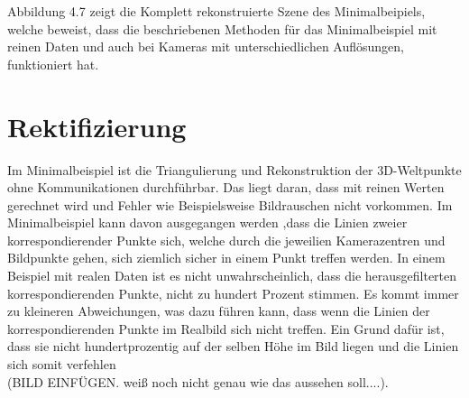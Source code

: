 \pagebreak
Abbildung 4.7 zeigt die Komplett rekonstruierte Szene des Minimalbeipiels, welche beweist, dass die beschriebenen Methoden für das Minimalbeispiel mit reinen Daten und auch bei Kameras mit unterschiedlichen Auflösungen, funktioniert hat. 

\section{Rektifizierung}
\label{sec:rectification}




Im Minimalbeispiel ist die Triangulierung und Rekonstruktion der 3D-Weltpunkte ohne Kommunikationen durchführbar. Das liegt daran, dass mit reinen Werten gerechnet wird und Fehler wie Beispielsweise Bildrauschen nicht vorkommen. Im Minimalbeispiel kann davon ausgegangen werden ,dass die Linien zweier korrespondierender Punkte sich, welche durch die jeweilien Kamerazentren und Bildpunkte gehen, sich ziemlich sicher in einem Punkt treffen werden. In einem Beispiel mit realen Daten ist es nicht unwahrscheinlich, dass die herausgefilterten korrespondierenden Punkte, nicht zu hundert Prozent stimmen. Es kommt immer zu kleineren Abweichungen, was dazu führen kann, dass wenn die Linien der korrespondierenden Punkte im Realbild sich nicht treffen. Ein Grund dafür ist, dass sie nicht hundertprozentig auf der selben Höhe im Bild liegen und die Linien sich somit verfehlen\\



 (BILD EINFÜGEN. weiß noch nicht genau wie das aussehen soll....).\\




